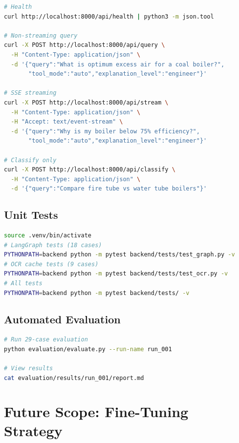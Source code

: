 \documentclass[12pt,a4paper]{report}
\begin{document}
\begin{lstlisting}[language=bash]
# Health
curl http://localhost:8000/api/health | python3 -m json.tool

# Non-streaming query
curl -X POST http://localhost:8000/api/query \
  -H "Content-Type: application/json" \
  -d '{"query":"What is optimum excess air for a coal boiler?",
       "tool_mode":"auto","explanation_level":"engineer"}'

# SSE streaming
curl -X POST http://localhost:8000/api/stream \
  -H "Content-Type: application/json" \
  -H "Accept: text/event-stream" \
  -d '{"query":"Why is my boiler below 75% efficiency?",
       "tool_mode":"auto","explanation_level":"engineer"}'

# Classify only
curl -X POST http://localhost:8000/api/classify \
  -H "Content-Type: application/json" \
  -d '{"query":"Compare fire tube vs water tube boilers"}'
\end{lstlisting}

\section{Unit Tests}

\begin{lstlisting}[language=bash]
source .venv/bin/activate
# LangGraph tests (18 cases)
PYTHONPATH=backend python -m pytest backend/tests/test_graph.py -v
# OCR cache tests (9 cases)
PYTHONPATH=backend python -m pytest backend/tests/test_ocr.py -v
# All tests
PYTHONPATH=backend python -m pytest backend/tests/ -v
\end{lstlisting}

\section{Automated Evaluation}

\begin{lstlisting}[language=bash]
# Run 29-case evaluation
python evaluation/evaluate.py --run-name run_001

# View results
cat evaluation/results/run_001/report.md
\end{lstlisting}

\chapter{Future Scope: Fine-Tuning Strategy}
\end{document}
